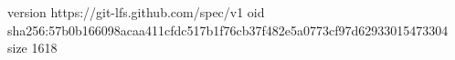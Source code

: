 version https://git-lfs.github.com/spec/v1
oid sha256:57b0b166098acaa411cfdc517b1f76cb37f482e5a0773cf97d62933015473304
size 1618
